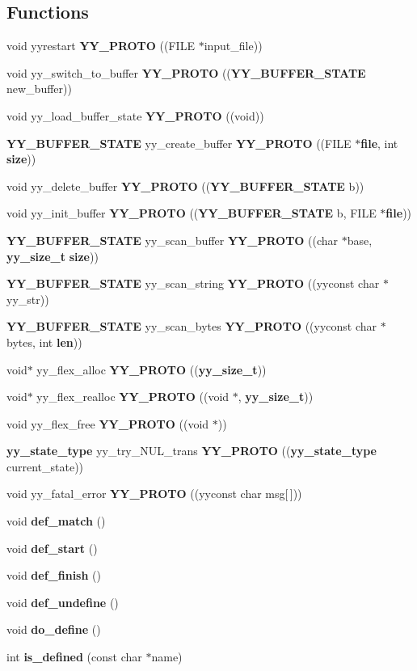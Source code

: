 \subsection*{Functions}
\begin{CompactItemize}
\item 
void yyrestart {\bf YY\_\-PROTO} ((FILE $\ast$input\_\-file))
\item 
void yy\_\-switch\_\-to\_\-buffer {\bf YY\_\-PROTO} (({\bf YY\_\-BUFFER\_\-STATE} new\_\-buffer))
\item 
void yy\_\-load\_\-buffer\_\-state {\bf YY\_\-PROTO} ((void))
\item 
{\bf YY\_\-BUFFER\_\-STATE} yy\_\-create\_\-buffer {\bf YY\_\-PROTO} ((FILE $\ast${\bf file}, int {\bf size}))
\item 
void yy\_\-delete\_\-buffer {\bf YY\_\-PROTO} (({\bf YY\_\-BUFFER\_\-STATE} b))
\item 
void yy\_\-init\_\-buffer {\bf YY\_\-PROTO} (({\bf YY\_\-BUFFER\_\-STATE} b, FILE $\ast${\bf file}))
\item 
{\bf YY\_\-BUFFER\_\-STATE} yy\_\-scan\_\-buffer {\bf YY\_\-PROTO} ((char $\ast$base, {\bf yy\_\-size\_\-t} {\bf size}))
\item 
{\bf YY\_\-BUFFER\_\-STATE} yy\_\-scan\_\-string {\bf YY\_\-PROTO} ((yyconst char $\ast$yy\_\-str))
\item 
{\bf YY\_\-BUFFER\_\-STATE} yy\_\-scan\_\-bytes {\bf YY\_\-PROTO} ((yyconst char $\ast$bytes, int {\bf len}))
\item 
void$\ast$ yy\_\-flex\_\-alloc {\bf YY\_\-PROTO} (({\bf yy\_\-size\_\-t}))
\item 
void$\ast$ yy\_\-flex\_\-realloc {\bf YY\_\-PROTO} ((void $\ast$, {\bf yy\_\-size\_\-t}))
\item 
void yy\_\-flex\_\-free {\bf YY\_\-PROTO} ((void $\ast$))
\item 
{\bf yy\_\-state\_\-type} yy\_\-try\_\-NUL\_\-trans {\bf YY\_\-PROTO} (({\bf yy\_\-state\_\-type} current\_\-state))
\item 
void yy\_\-fatal\_\-error {\bf YY\_\-PROTO} ((yyconst char msg[$\,$]))
\item 
void {\bf def\_\-match} ()
\item 
void {\bf def\_\-start} ()
\item 
void {\bf def\_\-finish} ()
\item 
void {\bf def\_\-undefine} ()
\item 
void {\bf do\_\-define} ()
\item 
int {\bf is\_\-defined} (const char $\ast$name)

\end{CompactItemize}
